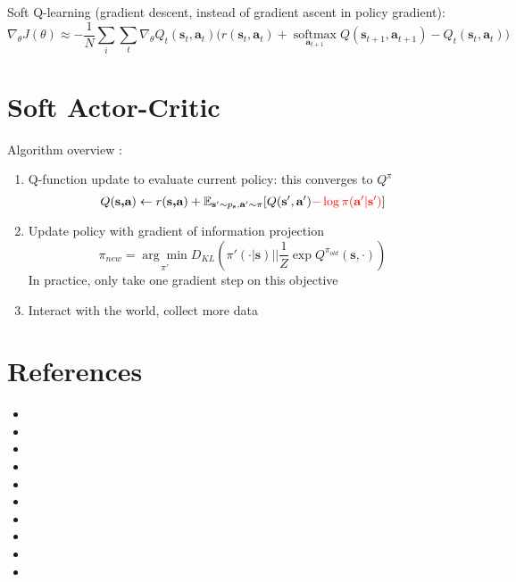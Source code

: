 Soft Q-learning (gradient descent, instead of gradient ascent in policy gradient):
\begin{equation}
	\nabla_\theta J(\theta) \approx - \frac{1}{N} \sum_i \sum_t \nabla_\theta Q_t(\textbf{s}_t, \textbf{a}_t) \big( r(\textbf{s}_t, \textbf{a}_t) + \underset{\textbf{a}_{t+1}}{\text{soft}\max} Q(\textbf{s}_{t+1}, \textbf{a}_{t+1}) - Q_t(\textbf{s}_t, \textbf{a}_t)\big)
\end{equation}

\section{Soft Actor-Critic}
Algorithm overview \cite{haarnoja2018soft}:
\begin{enumerate}
	\item Q-function update to evaluate current policy: this converges to $Q^\pi$
	\begin{equation}
		Q(\textbf{s,a}) \leftarrow r(\textbf{s,a}) + \mathbb{E}_{\textbf{s}' \sim p_\textbf{s}, \textbf{a}' \sim \pi} [Q(\textbf{s}', \textbf{a}') {\color{red} - \log \pi(\textbf{a}' | \textbf{s}')}]
	\end{equation}
	\item Update policy with gradient of information projection
	\begin{equation}
		\pi_{new} = \underset{\pi'}{\arg\min} D_{KL} \left( \pi'(\cdot | \textbf{s}) \Big|\Big| \frac{1}{Z} \exp Q^{\pi_{old}}(\textbf{s}, \cdot) \right)
	\end{equation}
	In practice, only take one gradient step on this objective
	\item Interact with the world, collect more data
\end{enumerate}

\section{References}
\begin{itemize}
	\item {}
	\item {}
	\item {}
	\item {}
	\item {}
	\item {}
	\item {}
	\item {}
	\item {}
	\item {}
\end{itemize}